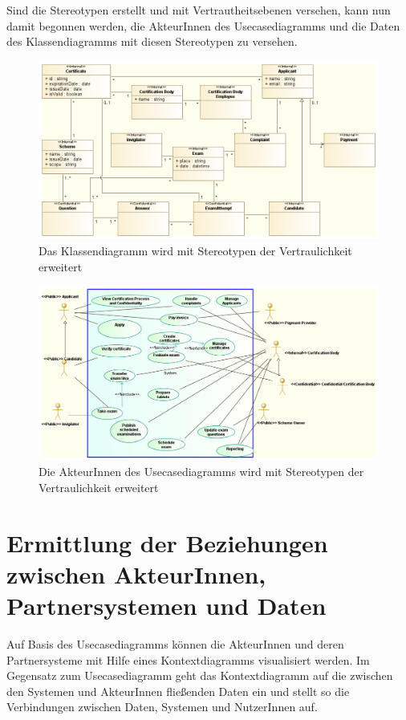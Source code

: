 Sind die Stereotypen erstellt und mit Vertrautheitsebenen versehen, kann nun damit begonnen werden, die AkteurInnen des Usecasediagramms und die Daten des Klassendiagramms mit diesen Stereotypen zu versehen.

\begin{figure}[H]
    \centering
    \includegraphics[scale=0.5]{uml/classstereotyped.png}
    \caption{Das Klassendiagramm wird mit Stereotypen der Vertraulichkeit erweitert}
\end{figure}

\begin{figure}[H]
    \centering
    \includegraphics[scale=0.4]{uml/stereotypedusecase.png}
    \caption{Die AkteurInnen des Usecasediagramms wird mit Stereotypen der Vertraulichkeit erweitert}
\end{figure}

\section{Ermittlung der Beziehungen zwischen AkteurInnen, Partnersystemen und Daten}
Auf Basis des Usecasediagramms können die AkteurInnen und deren Partnersysteme mit Hilfe eines Kontextdiagramms visualisiert werden. Im Gegensatz zum Usecasediagramm geht das Kontextdiagramm auf die zwischen den Systemen und AkteurInnen fließenden Daten ein und stellt so die Verbindungen zwischen Daten, Systemen und NutzerInnen auf.

